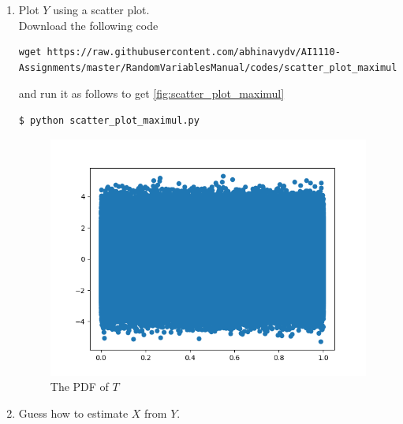 \documentclass[journal,12pt,twocolumn]{IEEEtran}
\renewcommand\thesection{\arabic{section}}
\begin{document}
\begin{enumerate}[label=\thesection.\arabic*
        ,ref=\thesection.\theenumi]
    \item Plot $Y$ using a scatter plot.\\
          \solution  Download the following code
          \begin{lstlisting}
wget https://raw.githubusercontent.com/abhinavydv/AI1110-Assignments/master/RandomVariablesManual/codes/scatter_plot_maximul.py
\end{lstlisting}
          and run it as follows to get \autoref{fig:scatter_plot_maximul}
          \begin{lstlisting}
$ python scatter_plot_maximul.py
\end{lstlisting}
          \begin{figure}
              \centering
              \includegraphics[width=\columnwidth]{./figs/maximul_scatter.png}
              \caption{The PDF of $T$}
              \label{fig:scatter_plot_maximul}
          \end{figure}


    \item Guess how to estimate $X$ from $Y$.\\
          \solution



\end{enumerate}
\end{document}
